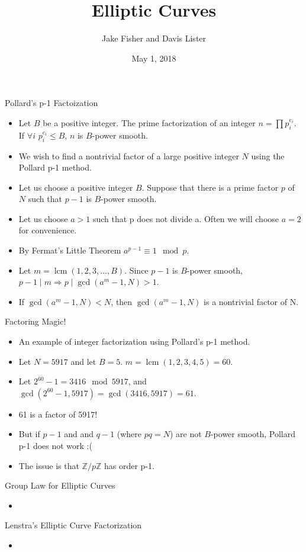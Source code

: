 \documentclass{beamer}
\title{Elliptic Curves}
\author{Jake Fisher and Davis Lister}
\date{May 1, 2018}
\DeclareMathOperator{\lcm}{lcm}
\begin{document}
	
	\begin{frame}
		\titlepage
	\end{frame}
	
	\begin{frame}{Pollard's p-1 Factoization}
		\begin{itemize}
			\item Let $B$ be a positive integer. The prime factorization of an integer $n=\prod p_{i}^{e_{i}}$. If $\forall i$ $p_{i}^{e_{i}} \leq B$, $n$ is $B$-power smooth.
			\item We wish to find a nontrivial factor of a large positive integer $N$ using the Pollard p-1 method.
			\item Let us choose a positive integer $B$. Suppose that there is a prime factor $p$ of $N$ such that $p-1$ is $B$-power smooth.
			\item Let us choose $a > 1$ such that p does not divide a. Often we will choose $a=2$ for convenience.
			\item By Fermat's Little Theorem $a^{p-1} \equiv 1 \mod p$.
			\item Let $m = \lcm (1,2,3,\dotso,B)$. Since $p-1$ is $B$-power smooth, $p-1 \mid m \Longrightarrow p \mid \gcd (a^m-1,N) > 1$.
			\item If $\gcd (a^m-1,N) < N$, then $\gcd (a^m-1,N)$ is a nontrivial factor of N.
		\end{itemize}
	\end{frame}
	
	\begin{frame}{Factoring Magic!}
		\begin{itemize}
			\item An example of integer factorization using Pollard's p-1 method.
			\item Let $N=5917$ and let $B=5$. $m=\lcm (1,2,3,4,5)=60$.
			\item Let $2^{60}-1=3416 \mod 5917$, and $\gcd (2^{60}-1, 5917)=\gcd (3416, 5917)=61$.
			\item 61 is a factor of 5917!
			\item But if $p-1$ and and $q-1$ (where $pq=N$) are not $B$-power smooth, Pollard p-1 does not work :(
			\item The issue is that $\mathbb{Z}/p\mathbb{Z}$ has order p-1.
		\end{itemize}
	\end{frame}
	
	\begin{frame}{Group Law for Elliptic Curves}
		\begin{itemize}
			\item
		\end{itemize}
	\end{frame}
	
	\begin{frame}{Lenstra's Elliptic Curve Factorization}
		\begin{itemize}
			\item
		\end{itemize}
	\end{frame}
\end{document}
